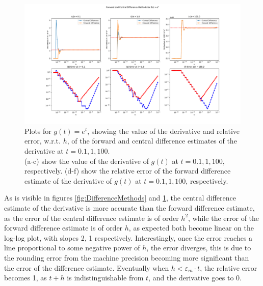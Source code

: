 \documentclass{article}
\theoremstyle{definition}
\theoremstyle{remark}
\begin{document}
\begin{figure}[H]
    \centering
    \includegraphics[width=1.2\textwidth]{DifferenceMethodsExp.pdf}
    \caption{\label{fig:DifferenceMethodsExp} Plots for $g(t) = e^t$, showing the value of the derivative and relative error, w.r.t. $h$, of the forward and central difference estimates of the derivative at $t=0.1, 1, 100$.\\
    \indent (a-c) show the value of the derivative of $g(t)$ at $t=0.1, 1, 100$, respectively. (d-f) show the relative error of the forward difference estimate of the derivative of $g(t)$ at $t=0.1, 1, 100$, respectively.}
\end{figure}
\indent As is visible in figures \ref{fig:DifferenceMethods} and \ref{fig:DifferenceMethodsExp}, the central difference estimate of the derivative is more accurate than the forward difference estimate, as the error of the central difference estimate is of order $h^2$, while the error of the forward difference estimate is of order $h$, as expected both become linear on the log-log plot, with slopes 2, 1 respectively. Interestingly, once the error reaches a line proportional to some negative power of $h$, the error diverges, this is due to the rounding error from the machine precision becoming more significant than the error of the difference estimate. Eventually when $h<\varepsilon_m\cdot t$, the relative error becomes 1, as $t+h$ is indistinguishable from $t$, and the derivative goes to 0.
\end{document}
